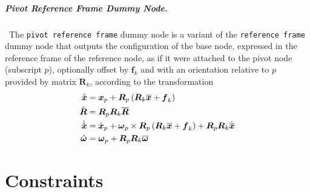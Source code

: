 \documentclass[10pt,dvips,fleqn]{report}
\newcommand{\T}[1]{\boldsymbol{#1}}
\begin{document}
\paragraph{Pivot Reference Frame Dummy Node.} \
The \texttt{pivot reference frame} dummy node is a variant
of the \texttt{reference frame} dummy node that outputs
the configuration of the base node, expressed in the reference
frame of the reference node, as if it were attached to the pivot node
(subscript $p$), optionally offset by $\T{f}_k$ and with
an orientation relative to $p$ provided by matrix $\T{R}_k$,
according to the transformation
\begin{align}
	\hat{\T{x}} &= \T{x}_p + \T{R}_p\plbr{\T{R}_k \overline{\T{x}} + \T{f}_k} \\
	\hat{\T{R}} &= \T{R}_p \T{R}_k \overline{\T{R}} \\
	\dot{\hat{\T{x}}} &= \dot{\T{x}}_p
		+ \T{\omega}_p \times\T{R}_p \plbr{
			\T{R}_k \overline{\T{x}} + \T{f}_k
		} + \T{R}_p \T{R}_k \dot{\overline{\T{x}}} \\
	\hat{\T{\omega}} &= \T{\omega}_p + \T{R}_p \T{R}_k \overline{\T{\omega}}
\end{align}




\chapter{Constraints}
\end{document}
